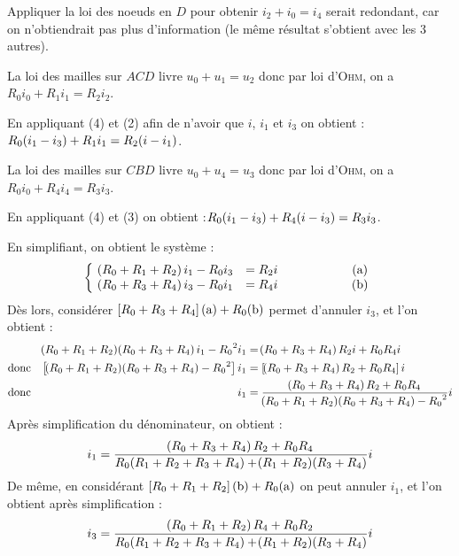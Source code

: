 \documentclass[a4paper,french,bookmarks]{article}
\begin{document}
    Appliquer la loi des noeuds en $D$ pour obtenir $i_2 + i_0 = i_4$ serait redondant, car on n'obtiendrait pas plus d'information (le même résultat s'obtient avec les 3 autres).
    
    \begin{enumerate}
        \itt La loi des mailles sur $ACD$ livre $u_0 + u_1 = u_2$ donc par loi d'\textsc{Ohm}, on a $R_0i_0 + R_1i_1 = R_2i_2$.
    
        En appliquant (4) et (2) afin de n'avoir que $i$, $i_1$ et $i_3$ on obtient :\qquad $R_0\!\left(i_1 - i_3\right) + R_1i_1 = R_2\!\left(i - i_1\right)$.
        
        \itt La loi des mailles sur $CBD$ livre $u_0 + u_4 = u_3$ donc par loi d'\textsc{Ohm}, on a $R_0i_0 + R_4i_4 = R_3i_3$.
    
        En appliquant (4) et (3) on obtient :\qquad $R_0\!\left(i_1 - i_3\right) + R_4\!\left(i - i_3\right) = R_3i_3$.
    \end{enumerate}
    
    En simplifiant, on obtient le système :
    \begin{equation*}
        \left\lbrace\begin{array}{cccc}
            \!\left(R_0 + R_1 + R_2\right)i_1 - R_0i_3 &= R_2i &\qquad\qquad& \text{(a)} \\
            \!\left(R_0 + R_3 + R_4\right)i_3 - R_0i_1 &= R_4i &\qquad\qquad& \text{(b)}
        \end{array}\right.
    \end{equation*}
    \text{}\bigskip 
    Dès lors, considérer $\left[R_0 + R_3 + R_4\right]\text{(a)} + R_0\text{(b)}$ permet d'annuler $i_3$, et l'on obtient :
    \begin{align*}
        && \p{R_0 + R_1 + R_2}\p{R_0 + R_3 + R_4}i_1 - {R_0}^2i_1 &= \p{R_0 + R_3 + R_4}R_2i + R_0R_4i\\
        \text{donc} && \intc{\p{R_0 + R_1 + R_2}\p{R_0 + R_3 + R_4} - {R_0}^2}i_1 &= \intc{\p{R_0 + R_3 + R_4}R_2 + R_0R_4}i\\
        \text{donc} && i_1 &= \dfrac{\p{R_0 + R_3 + R_4}R_2 + R_0R_4}{\p{R_0 + R_1 + R_2}\p{R_0 + R_3 + R_4} - {R_0}^2}i
    \end{align*}
    Après simplification du dénominateur, on obtient :
    \begin{equation}
        i_1 = \dfrac{\!\left(R_0 + R_3 + R_4\right)R_2 + R_0R_4}{R_0\!\left(R_1 + R_2 + R_3 + R_4\right) + \!\left(R_1 + R_2\right)\!\left(R_3 + R_4\right)}i
    \end{equation}
    De même, en considérant $\left[R_0 + R_1 + R_2\right]\text{(b)} + R_0\text{(a)}$ on peut annuler $i_1$, et l'on obtient après simplification :
    \begin{equation}
        i_3 = \dfrac{\!\left(R_0 + R_1 + R_2\right)R_4 + R_0R_2}{R_0\!\left(R_1 + R_2 + R_3 + R_4\right) + \!\left(R_1 + R_2\right)\!\left(R_3 + R_4\right)}i
    \end{equation}
    
\end{document}
